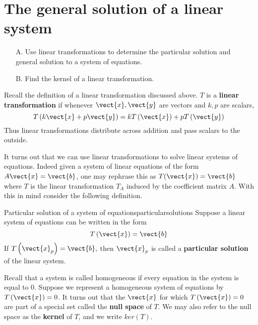 \section{The general solution of a linear system}

\begin{outcome}
\begin{enumerate}
\item[A.]  Use linear transformations to determine the particular solution and general solution to a system of equations.

\item[B.]  Find the kernel of a linear transformation. 
\end{enumerate}
\end{outcome}

Recall the definition of a linear transformation discussed above. 
$T$ is a \textbf{linear transformation} if whenever $\vect{x}, \vect{y}$ are
vectors and $k,p$ are scalars,
\begin{equation*}
T\left( k\vect{x}+p\vect{y}\right) =k T \left( \vect{x} \right) +p T\left(\vect{y} \right)
\end{equation*}
Thus linear transformations distribute across addition and pass scalars to
the outside.

It turns out that we can use linear transformations to solve linear
systems of equations. Indeed given a system of linear equations of the
form $A\vect{x}=\vect{b}$, one may rephrase this as $T(\vect{x})=\vect{b}$ where $T$ is the linear
transformation $T_A$ induced by the coefficient matrix $A$. With this in mind consider the following definition. 

\begin{definition}{Particular solution of a system of equations}{particularsolutions}
Suppose a linear system of equations can be written in the form
\begin{equation*}
T\left(\vect{x}\right)=\vect{b}
\end{equation*}
If $T\left(\vect{x}_{p}\right)=\vect{b},$ 
then $\vect{x}_{p}$ is called a \textbf{particular solution} of
the linear system.
\end{definition}

Recall that a system is called homogeneous if every equation in the system is equal to $0$. 
Suppose we represent a homogeneous system of equations by $T\left(\vect{x}\right)=0$. It turns out
that the $\vect{x}$ for which $T \left(\vect{x}\right) = 0$ are part of a special set called the \textbf{null space}
of $T$. We may also refer to the null space as the \textbf{kernel} of $T$, and we write $ker\left(T\right)$. 

